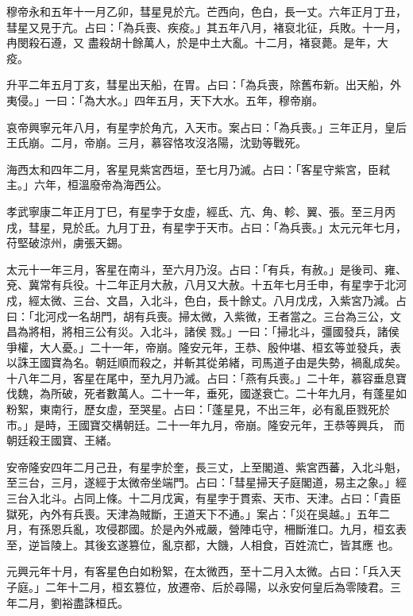 \begin{pinyinscope}
 穆帝永和五年十一月乙卯，彗星見於亢。芒西向，色白，長一丈。六年正月丁丑，彗星又見于亢。占曰：「為兵喪、疾疫。」其五年八月，褚裒北征，兵敗。十一月，冉閔殺石遵，又
 盡殺胡十餘萬人，於是中土大亂。十二月，褚裒薨。是年，大疫。



 升平二年五月丁亥，彗星出天船，在胃。占曰：「為兵喪，除舊布新。出天船，外夷侵。」一曰：「為大水。」四年五月，天下大水。五年，穆帝崩。



 哀帝興寧元年八月，有星孛於角亢，入天市。案占曰：「為兵喪。」三年正月，皇后王氏崩。二月，帝崩。三月，慕容恪攻沒洛陽，沈勁等戰死。



 海西太和四年二月，客星見紫宮西垣，至七月乃滅。占曰：「客星守紫宮，臣弒主。」六年，桓溫廢帝為海西公。



 孝武寧康二年正月丁巳，有星孛于女虛，經氐、亢、角、軫、翼、張。至三月丙戌，彗星，見於氐。九月丁丑，有星孛于天市。占曰：「為兵喪。」太元元年七月，苻堅破涼州，虜張天錫。



 太元十一年三月，客星在南斗，至六月乃沒。占曰：「有兵，有赦。」是後司、雍、兗、冀常有兵役。十二年正月大赦，八月又大赦。十五年七月壬申，有星孛于北河戍，經太微、三台、文昌，入北斗，色白，長十餘丈。八月戊戌，入紫宮乃減。占曰：「北河戍一名胡門，胡有兵喪。掃太微，入紫微，王者當之。三台為三公，文昌為將相，將相三公有災。入北斗，諸侯
 戮。」一曰：「掃北斗，彊國發兵，諸侯爭權，大人憂。」二十一年，帝崩。隆安元年，王恭、殷仲堪、桓玄等並發兵，表以誅王國寶為名。朝廷順而殺之，并斬其從弟緒，司馬道子由是失勢，禍亂成矣。十八年二月，客星在尾中，至九月乃滅。占曰：「燕有兵喪。」二十年，慕容垂息寶伐魏，為所破，死者數萬人。二十一年，垂死，國遂衰亡。二十年九月，有蓬星如粉絮，東南行，歷女虛，至哭星。占曰：「蓬星見，不出三年，必有亂臣戮死於市。」是時，王國寶交構朝廷。二十一年九月，帝崩。隆安元年，王恭等興兵，
 而朝廷殺王國寶、王緒。



 安帝隆安四年二月己丑，有星孛於奎，長三丈，上至閣道、紫宮西蕃，入北斗魁，至三台，三月，遂經于太微帝坐端門。占曰：「彗星掃天子庭閣道，易主之象。」經三台入北斗。占同上條。十二月戊寅，有星孛于貫索、天市、天津。占曰：「貴臣獄死，內外有兵喪。天津為賊斷，王道天下不通。」案占：「災在吳越。」五年二月，有孫恩兵亂，攻侵郡國。於是內外戒嚴，營陣屯守，柵斷淮口。九月，桓玄表至，逆旨陵上。其後玄遂篡位，亂京都，大饑，人相食，百姓流亡，皆其應
 也。



 元興元年十月，有客星色白如粉絮，在太微西，至十二月入太微。占曰：「兵入天子庭。」二年十二月，桓玄篡位，放遷帝、后於尋陽，以永安何皇后為零陵君。三年二月，劉裕盡誅桓氏。




\end{pinyinscope}
